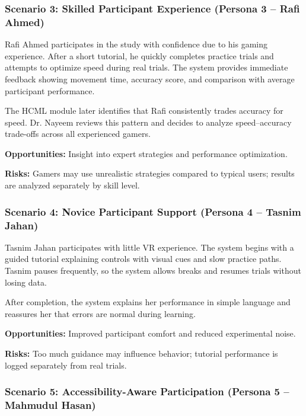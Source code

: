 \documentclass[sigconf]{acmart}
\begin{document}
\subsubsection{Scenario 3: Skilled Participant Experience (Persona 3 – Rafi Ahmed)}

Rafi Ahmed participates in the study with confidence due to his gaming experience.
After a short tutorial, he quickly completes practice trials and attempts to optimize
speed during real trials. The system provides immediate feedback showing movement time,
accuracy score, and comparison with average participant performance.

The HCML module later identifies that Rafi consistently trades accuracy for speed.
Dr. Nayeem reviews this pattern and decides to analyze speed–accuracy trade-offs across
all experienced gamers.

\textbf{Opportunities:}
Insight into expert strategies and performance optimization.

\textbf{Risks:}
Gamers may use unrealistic strategies compared to typical users; results are analyzed
separately by skill level.

\subsubsection{Scenario 4: Novice Participant Support (Persona 4 – Tasnim Jahan)}

Tasnim Jahan participates with little VR experience. The system begins with a guided
tutorial explaining controls with visual cues and slow practice paths. Tasnim pauses
frequently, so the system allows breaks and resumes trials without losing data.

After completion, the system explains her performance in simple language and reassures
her that errors are normal during learning.

\textbf{Opportunities:}
Improved participant comfort and reduced experimental noise.

\textbf{Risks:}
Too much guidance may influence behavior; tutorial performance is logged separately
from real trials.

\subsubsection{Scenario 5: Accessibility-Aware Participation (Persona 5 – Mahmudul Hasan)}
\end{document}
